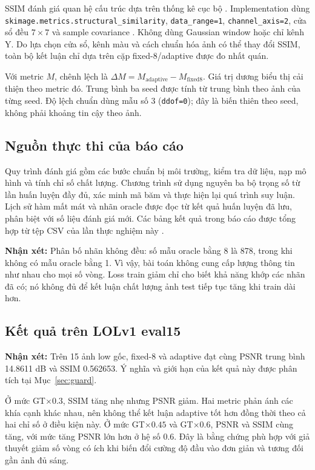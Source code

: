 SSIM đánh giá quan hệ cấu trúc dựa trên thống kê cục bộ \cite{ssim}. Implementation dùng \texttt{skimage.metrics.structural\_similarity}, \texttt{data\_range=1}, \texttt{channel\_axis=2}, cửa sổ đều $7\times7$ và sample covariance \cite{skimage}. Không dùng Gaussian window hoặc chỉ kênh Y. Do lựa chọn cửa sổ, kênh màu và cách chuẩn hóa ảnh có thể thay đổi SSIM, toàn bộ kết luận chỉ dựa trên cặp fixed-8/adaptive được đo nhất quán.

Với metric $M$, chênh lệch là $\Delta M=M_{\mathrm{adaptive}}-M_{\mathrm{fixed8}}$. Giá trị dương biểu thị cải thiện theo metric đó. Trung bình ba seed được tính từ trung bình theo ảnh của từng seed. Độ lệch chuẩn dùng mẫu số 3 (\texttt{ddof=0}); đây là biến thiên theo seed, không phải khoảng tin cậy theo ảnh.

\subsection{Nguồn thực thi của báo cáo}
Quy trình đánh giá gồm các bước chuẩn bị môi trường, kiểm tra dữ liệu, nạp mô hình và tính chỉ số chất lượng. Chương trình sử dụng nguyên ba bộ trọng số từ lần huấn luyện đầy đủ, xác minh mã băm và thực hiện lại quá trình suy luận. Lịch sử hàm mất mát và nhãn oracle được đọc từ kết quả huấn luyện đã lưu, phân biệt với số liệu đánh giá mới. Các bảng kết quả trong báo cáo được tổng hợp từ tệp CSV của lần thực nghiệm này \cite{artifact}.

\textbf{Nhận xét:} Phân bố nhãn không đều: số mẫu oracle bằng 8 là 878, trong khi không có mẫu oracle bằng 1. Vì vậy, bài toán không cung cấp lượng thông tin như nhau cho mọi số vòng. Loss train giảm chỉ cho biết khả năng khớp các nhãn đã có; nó không đủ để kết luận chất lượng ảnh test tiếp tục tăng khi train dài hơn.

\subsection{Kết quả trên LOLv1 eval15}

\textbf{Nhận xét:} Trên 15 ảnh low gốc, fixed-8 và adaptive đạt cùng PSNR trung bình 14.8611 dB và SSIM 0.562653. Ý nghĩa và giới hạn của kết quả này được phân tích tại Mục~\ref{sec:guard}.

Ở mức GT$\times0.3$, SSIM tăng nhẹ nhưng PSNR giảm. Hai metric phản ánh các khía cạnh khác nhau, nên không thể kết luận adaptive tốt hơn đồng thời theo cả hai chỉ số ở điều kiện này. Ở mức GT$\times0.45$ và GT$\times0.6$, PSNR và SSIM cùng tăng, với mức tăng PSNR lớn hơn ở hệ số 0.6. Đây là bằng chứng phù hợp với giả thuyết giảm số vòng có ích khi biến đổi cường độ đầu vào đơn giản và tương đối gần ảnh đủ sáng.

